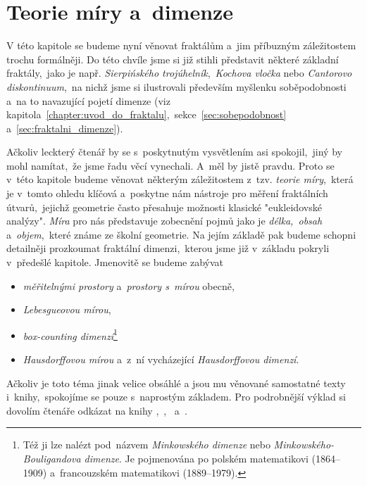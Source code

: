 \chapter{Teorie míry a~dimenze}\label{chapter:teorie-miry-a-dimenze}

V této kapitole se budeme nyní věnovat fraktálům a~jim příbuzným záležitostem trochu formálněji. Do této chvíle jsme si již stihli představit některé základní fraktály,~jako je např. \emph{Sierpińského trojúhelník},~\emph{Kochova vločka} nebo \emph{Cantorovo diskontinuum},~na nichž jsme si ilustrovali především myšlenku soběpodobnosti a~na to navazující pojetí dimenze (viz kapitola~\ref{chapter:uvod_do_fraktalu},~sekce~\ref{sec:sobepodobnost} a~\ref{sec:fraktalni_dimenze}).

Ačkoliv leckterý čtenář by se s~poskytnutým vysvětlením asi spokojil,~jiný by mohl namítat,~že jsme řadu věcí vynechali. A~měl by jistě pravdu. Proto se v~této kapitole budeme věnovat některým záležitostem z~tzv. \emph{teorie míry},~která je v~tomto ohledu klíčová a~poskytne nám nástroje pro měření fraktálních útvarů,~jejichž geometrie často přesahuje možnosti klasické "eukleidovské analýzy". \emph{Míra} pro nás představuje zobecnění pojmů jako je \emph{délka,~obsah} a~\emph{objem},~které známe ze školní geometrie. Na jejím základě pak budeme schopni detailněji prozkoumat fraktální dimenzi,~kterou jsme již v~základu pokryli v~předešlé kapitole. Jmenovitě se budeme zabývat
\begin{itemize}
    \item \emph{měřitelnými prostory} a~\emph{prostory s~mírou} obecně,
    \item \emph{Lebesgueovou mírou},
    \item \emph{box-counting dimenzí}\footnote{Též ji lze nalézt pod~názvem \emph{Minkowského dimenze} nebo \emph{Minkowského-Bouligandova dimenze}. Je pojmenována po polském matematikovi  (1864--1909) a~francouzském matematikovi  (1889--1979).}
    \item \emph{Hausdorffovou mírou} a~z~ní vycházející \emph{Hausdorffovou dimenzí}.
\end{itemize}

Ačkoliv je toto téma jinak velice obsáhlé a jsou mu věnované samostatné texty i~knihy,~spokojíme se pouze s~naprostým základem. Pro podrobnější výklad si dovolím čtenáře odkázat na knihy \cite{Falconer2014},~\cite{Lukes2013},~\cite{NetukaIntegral2016} a~\cite{Edgar2008}.

